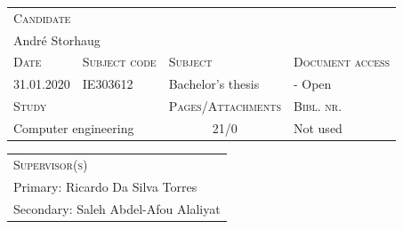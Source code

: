 \noindent
\begin{tabularx}{\textwidth}{ |l|l|X|X| }
	\hline
	\multicolumn{4}{|l|}{\scshape{Candidate}}\\
	\multicolumn{4}{|l|}{André Storhaug}\\
  	\hline
  	\scshape{Date} & \scshape{Subject code} & \scshape{Subject} & \scshape{Document access} \\
  	31.01.2020 & IE303612 & Bachelor's thesis & - Open \\
  	\hline
	\multicolumn{2}{|l|}{\scshape{Study}} & \scshape{Pages/Attachments} & \scshape{Bibl. nr.}\\
	\multicolumn{2}{|l|}{Computer engineering} & \multicolumn{1}{c|}{21/0} & Not used \\
  	\hline 
\end{tabularx}
\vspace{1em}

\noindent
\begin{tabularx}{\textwidth}{ |X| }
	\hline
	\scshape{Supervisor(s)}\\
	Primary: Ricardo Da Silva Torres\\
	Secondary: Saleh Abdel-Afou Alaliyat\\
  	\hline 
\end{tabularx}

\noindent


\restoregeometry
